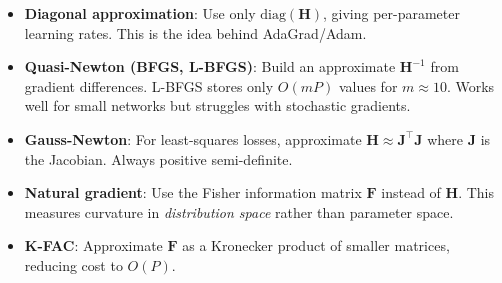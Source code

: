 \begin{remark}\leavevmode
    \begin{itemize}
        \item \textbf{Diagonal approximation}: Use only $\text{diag}(\mathbf{H})$, giving per-parameter learning rates. This is the idea behind AdaGrad/Adam.
        \item \textbf{Quasi-Newton (BFGS, L-BFGS)}: Build an approximate $\mathbf{H}^{-1}$ from gradient differences. L-BFGS stores only $O(mP)$ values for $m \approx 10$. Works well for small networks but struggles with stochastic gradients.
        \item \textbf{Gauss-Newton}: For least-squares losses, approximate $\mathbf{H} \approx \mathbf{J}^\top\mathbf{J}$ where $\mathbf{J}$ is the Jacobian. Always positive semi-definite.
        \item \textbf{Natural gradient}: Use the Fisher information matrix $\mathbf{F}$ instead of $\mathbf{H}$. This measures curvature in \emph{distribution space} rather than parameter space.
        \item \textbf{K-FAC}: Approximate $\mathbf{F}$ as a Kronecker product of smaller matrices, reducing cost to $O(P)$.
    \end{itemize}
\end{remark}

